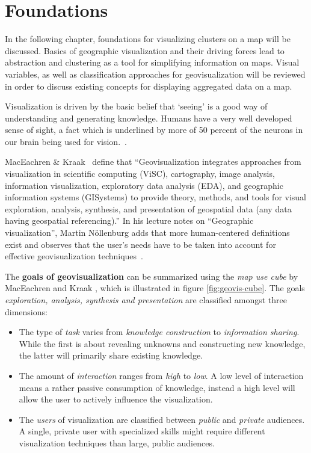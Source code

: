 
%
%

\chapter{Foundations}
\label{chapter:foundations-vis}

In the following chapter, foundations for visualizing clusters on a map will be discussed. Basics of geographic visualization and their driving forces lead to abstraction and clustering as a tool for simplifying information on maps. Visual variables, as well as classification approaches for geovisualization will be reviewed in order to discuss existing concepts for displaying aggregated data on a map.

Visualization is driven by the basic belief that `seeing' is a good way of understanding and generating knowledge. Humans have a very well developed sense of sight, a fact which is underlined by more of 50 percent of the neurons in our brain being used for vision.~\cite{vislecture}. 

MacEachren \& Kraak~\cite{maceachren-geovis} define that ``Geovisualization integrates approaches from visualization in scientific computing (ViSC), cartography, image analysis, information visualization, exploratory data analysis (EDA), and geographic information systems (GISystems) to provide theory, methods, and tools for visual exploration, analysis, synthesis, and presentation of geospatial data (any data having geospatial referencing).'' In his lecture notes on ``Geographic visualization'', Martin N\"{o}llenburg adds that more human-centered definitions exist and observes that the user's needs have to be taken into account for effective geovisualization techniques~\cite{noellenburg11geovis}.


The \textbf{goals of geovisualization} can be summarized using the \textit{map use cube} by MacEachren and Kraak \cite{MacEachren07cartovis}, which is illustrated in figure \ref{fig:geovis-cube}. The goals \textit{exploration, analysis, synthesis and presentation} are classified amongst three dimensions:

\begin{itemize}

\item The type of \textit{task} varies from \textit{knowledge construction} to \textit{information sharing}. While the first is about revealing unknowns and constructing new knowledge, the latter will primarily share existing knowledge.

\item The amount of \textit{interaction} ranges from \textit{high} to \textit{low}. A low level of interaction means a rather passive consumption of knowledge, instead a high level will allow the user to actively influence the visualization.

\item The \textit{users} of visualization are classified between \textit{public} and \textit{private} audiences. A single, private user with specialized skills might require different visualization techniques than large, public audiences.

\end{itemize}

